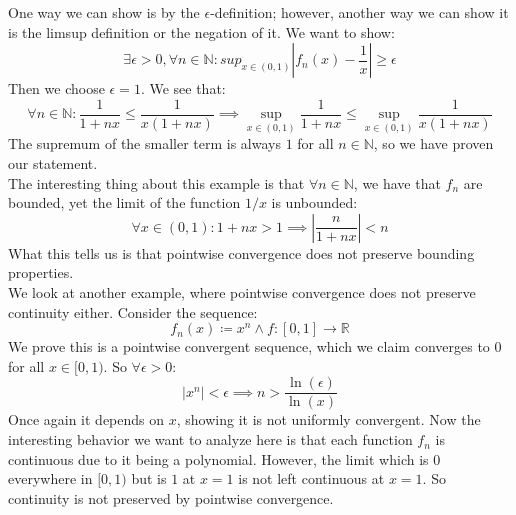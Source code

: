 \documentclass[10pt,letterpaper]{article} %
\begin{document}
One way we can show is by the $\epsilon$-definition; however, another way we can show it is the limsup definition or the negation of it. We want to show:
\begin{equation*}
  \exists \epsilon > 0, \forall n \in \mathbb{N}: sup_{x \in (0, 1)}|f_n(x) - \frac{1}{x}| \geqslant \epsilon
\end{equation*}
Then we choose $\epsilon = 1$. We see that:
\begin{equation*}
  \forall n \in \mathbb{N}: \frac{1}{1+nx} \leqslant \frac{1}{x(1+nx)} \implies \sup_{x \in (0, 1)}\frac{1}{1+nx} \leqslant \sup_{x \in (0, 1)}\frac{1}{x(1+nx)}
\end{equation*}
The supremum of the smaller term is always $1$ for all $n \in \mathbb{N}$, so we have proven our statement.\\

The interesting thing about this example is that $\forall n \in \mathbb{N}$, we have that $f_n$ are bounded, yet the limit of the function $1/x$ is unbounded:
\begin{equation*}
  \forall x \in (0, 1): 1 + nx > 1 \implies \left|\frac{n}{1+nx}\right| < n
\end{equation*}
What this tells us is that pointwise convergence does not preserve bounding properties.\\

We look at another example, where pointwise convergence does not preserve continuity either. Consider the sequence:
\begin{equation*}
  f_n(x) \coloneq x^n \land f: [0, 1] \xrightarrow{} \mathbb{R}
\end{equation*}
We prove this is a pointwise convergent sequence, which we claim converges to $0$ for all $x \in [0, 1)$. So $\forall \epsilon > 0$:
\begin{equation*}
  |x^n| < \epsilon \implies n > \frac{\ln(\epsilon)}{\ln(x)}
\end{equation*}
Once again it depends on $x$, showing it is not uniformly convergent. Now the interesting behavior we want to analyze here is that each function $f_n$ is continuous due to it being a polynomial. However, the limit which is $0$ everywhere in $[0, 1)$ but is $1$ at $x = 1$ is not left continuous at $x = 1$. So continuity is not preserved by pointwise convergence.\\
\end{document}
